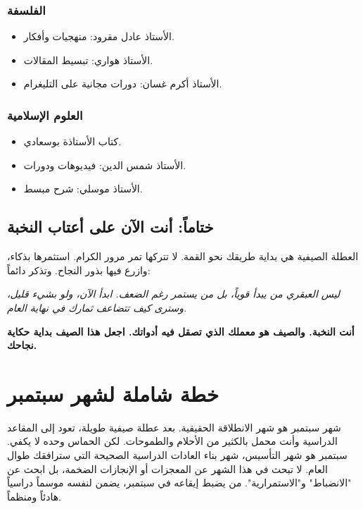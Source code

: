 \documentclass[12pt,a4paper]{book}
\newcommand{\quoteAr}[1]{%
	\begin{myquote}
		\itshape #1
	\end{myquote}
}
\newcommand{\importantAr}[1]{%
	\begin{important}
		\bfseries #1
	\end{important}
}
\begin{document}
	\subsubsection{الفلسفة}
	\begin{itemize}
		\item الأستاذ عادل مقرود: منهجيات وأفكار.
		\item الأستاذ هواري: تبسيط المقالات.
		\item الأستاذ أكرم غسان: دورات مجانية على التليغرام.
	\end{itemize}
	
	\subsubsection{العلوم الإسلامية}
	\begin{itemize}
		\item كتاب الأستاذة بوسعادي.
		\item الأستاذ شمس الدين: فيديوهات ودورات.
		\item الأستاذ موسلي: شرح مبسط.
	\end{itemize}
	
	\subsection{ختاماً: أنت الآن على أعتاب النخبة}
	
	العطلة الصيفية هي بداية طريقك نحو القمة. لا تتركها تمر مرور الكرام. استثمرها بذكاء، وازرع فيها بذور النجاح. وتذكر دائماً:
	
	\quoteAr{ليس العبقري من يبدأ قوياً، بل من يستمر رغم الضعف. ابدأ الآن، ولو بشيء قليل، وسترى كيف تتضاعف ثمارك في نهاية العام.}
	
	\importantAr{أنت النخبة. والصيف هو معملك الذي تصقل فيه أدواتك. اجعل هذا الصيف بداية حكاية نجاحك.}
	
	\section{خطة شاملة لشهر سبتمبر}
	
	شهر سبتمبر هو شهر الانطلاقة الحقيقية. بعد عطلة صيفية طويلة، تعود إلى المقاعد الدراسية وأنت محمل بالكثير من الأحلام والطموحات. لكن الحماس وحده لا يكفي. سبتمبر هو شهر التأسيس، شهر بناء العادات الدراسية الصحيحة التي سترافقك طوال العام. لا تبحث في هذا الشهر عن المعجزات أو الإنجازات الضخمة، بل ابحث عن "الانضباط" و"الاستمرارية". من يضبط إيقاعه في سبتمبر، يضمن لنفسه موسماً دراسياً هادئاً ومنظماً.
	
\end{document}
